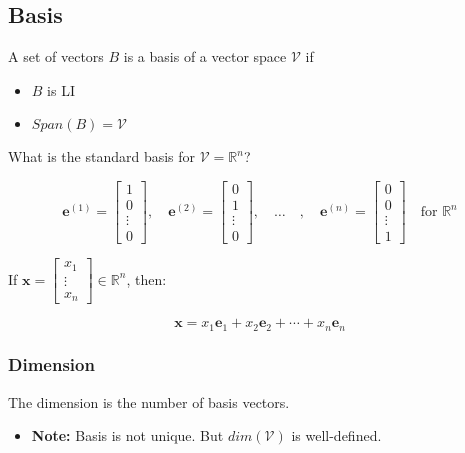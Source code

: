 \subsection{Basis}
\begin{definition}
    A set of vectors $B$ is a basis of a vector space $\mathcal{V}$ if 
    \begin{itemize}
        \item $B$ is LI
        \item $Span(B)=\mathcal{V}$
    \end{itemize} 
\end{definition}

\begin{example}
    What is the standard basis for $\mathcal{V} = \mathbb{R}^n$?
    \vspace{1em}

    \[
    \mathbf{e}^{(1)} = \begin{bmatrix}
    1 \\
    0 \\
    \vdots \\
    0
    \end{bmatrix}, \quad
    \mathbf{e}^{(2)} = \begin{bmatrix}
    0 \\
    1 \\
    \vdots \\
    0
    \end{bmatrix}, \quad \dots \quad, \quad
    \mathbf{e}^{(n)} = \begin{bmatrix}
    0 \\
    0 \\
    \vdots \\
    1
    \end{bmatrix}
    \quad \text{for } \mathbb{R}^n
    \]

    If \( \mathbf{x} = \begin{bmatrix} x_1 \\ \vdots \\ x_n \end{bmatrix} \in \mathbb{R}^n \), then:

    \[
    \mathbf{x} = x_1 \mathbf{e}_1 + x_2 \mathbf{e}_2 + \cdots + x_n \mathbf{e}_n
    \]
\end{example}

\subsubsection{Dimension}
\begin{definition}
    The dimension is the number of basis vectors.
    \begin{itemize}
        \item \textbf{Note:} Basis is not unique. But $dim(\mathcal{V})$ is well-defined.
    \end{itemize}
\end{definition}

